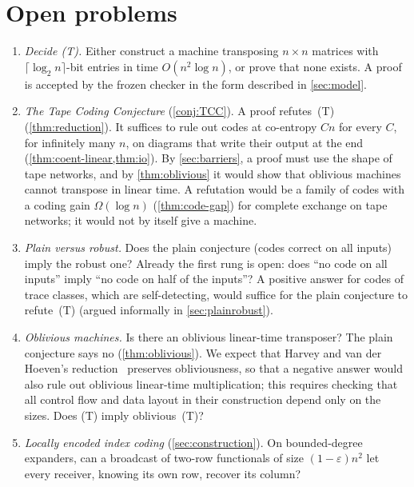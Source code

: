 \section{Open problems}\label{sec:open}

\begin{enumerate}[label=\arabic*.,leftmargin=2em]
\item \emph{Decide (T).} Either construct a machine transposing $n\times n$ matrices with $\lceil\log_2n\rceil$-bit
entries in time $O(n^2\log n)$, or prove that none exists. A proof is accepted by the frozen checker in the form
described in \cref{sec:model}.

\item \emph{The Tape Coding Conjecture} (\cref{conj:TCC}). A proof refutes~(T) (\cref{thm:reduction}). It suffices to
rule out codes at co-entropy $Cn$ for every $C$, for infinitely many $n$, on diagrams that write their output at the
end (\cref{thm:coent-linear,thm:io}). By \cref{sec:barriers}, a proof must use the shape of tape networks, and by \cref{thm:oblivious} it
would show that oblivious machines cannot transpose in linear time. A refutation would be a family of codes with a
coding gain $\Omega(\log n)$ (\cref{thm:code-gap}) for complete exchange on tape networks; it would not by itself give
a machine.

\item \emph{Plain versus robust.} Does the plain conjecture (codes correct on all inputs) imply the robust one? Already
the first rung is open: does ``no code on all inputs'' imply ``no code on half of the inputs''? A positive answer
for codes of trace classes, which are self-detecting, would suffice for the plain conjecture to refute~(T) (argued
informally in \cref{sec:plainrobust}).

\item \emph{Oblivious machines.} Is there an oblivious linear-time transposer? The plain conjecture says no
(\cref{thm:oblivious}). We expect that Harvey and van der Hoeven's reduction~\cite{HvdH2025} preserves obliviousness,
so that a negative answer would also rule out oblivious linear-time multiplication; this requires checking that all
control flow and data layout in their construction depend only on the sizes. Does (T) imply oblivious~(T)?

\item \emph{Locally encoded index coding} (\cref{sec:construction}). On bounded-degree expanders, can a broadcast of
two-row functionals of size $(1-\varepsilon)n^2$ let every receiver, knowing its own row, recover its column?


\end{enumerate}

